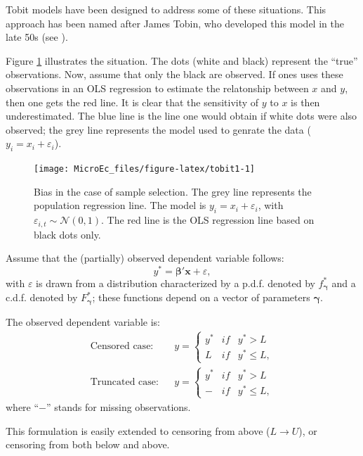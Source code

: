 \documentclass[
  12pt,
]{book}
\theoremstyle{definition}
\theoremstyle{definition}
\theoremstyle{definition}
\theoremstyle{definition}
\theoremstyle{remark}
\begin{document}
Tobit models have been designed to address some of these situations. This approach has been named after James Tobin, who developed this model in the late 50s (see \citet{Tobin_1956}).

Figure \ref{fig:tobit1} illustrates the situation. The dots (white and black) represent the ``true'' observations. Now, assume that only the black are observed. If ones uses these observations in an OLS regression to estimate the relatonship between \(x\) and \(y\), then one gets the red line. It is clear that the sensitivity of \(y\) to \(x\) is then underestimated. The blue line is the line one would obtain if white dots were also observed; the grey line represents the model used to genrate the data (\(y_i=x_i+\varepsilon_i\)).

\begin{figure}
\texttt{[image: MicroEc\_files/figure-latex/tobit1-1]} \caption{Bias in the case of sample selection. The grey line represents the population regression line. The model is $y_i = x_i + \varepsilon_i$, with $\varepsilon_{i,t} \sim \mathcal{N}(0,1)$. The red line is the OLS regression line based on black dots only.}\label{fig:tobit1}
\end{figure}

Assume that the (partially) observed dependent variable follows:
\[
y^* = \boldsymbol\beta'\mathbf{x} + \varepsilon,
\]
with \(\varepsilon\) is drawn from a distribution characterized by a p.d.f. denoted by \(f_{\boldsymbol\gamma}^*\) and a c.d.f. denoted by \(F_{\boldsymbol\gamma}^*\); these functions depend on a vector of parameters \(\boldsymbol{\gamma}\).

The observed dependent variable is:
\begin{eqnarray*}
\mbox{Censored case:}&&y = \left\{
\begin{array}{ccc}
y^* &if& y^*>L \\
L &if& y^*\le L,
\end{array}
\right.\\
\mbox{Truncated case:}&&y = \left\{
\begin{array}{ccc}
y^* &if& y^*>L \\
- &if& y^*\le L,
\end{array}
\right.
\end{eqnarray*}
where ``\(-\)'' stands for missing observations.

This formulation is easily extended to censoring from above (\(L \rightarrow U\)), or censoring from both below and above.
\end{document}
